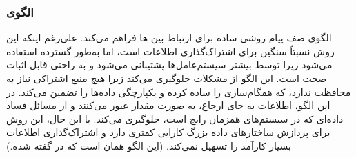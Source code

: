 \subsubsection{الگوی }
\label{archConMessageQueSec}
\begin{RTL}
الگوی صف پیام روشی ساده برای ارتباط بین  ها فراهم می‌کند.
علی‌رغم اینکه این روش نسبتاً سنگین برای اشتراک‌گذاری اطلاعات است، اما به‌طور گسترده
استفاده می‌شود زیرا توسط بیشتر سیستم‌عامل‌ها پشتیبانی می‌شود و به راحتی
قابل اثبات صحت است. این الگو از مشکلات 
جلوگیری می‌کند زیرا هیچ منبع اشتراکی نیاز به محافظت ندارد، که همگام‌سازی را ساده کرده
و یکپارچگی داده‌ها را تضمین می‌کند. در این الگو، اطلاعات به جای ارجاع،
به صورت مقدار عبور می‌کنند و از مسائل فساد داده‌ای
که در سیستم‌های همزمان رایج است، جلوگیری می‌کند. با این حال،
این روش برای پردازش ساختارهای داده بزرگ کارایی کمتری دارد
و اشتراک‌گذاری اطلاعات بسیار کارآمد را تسهیل نمی‌کند.
(این الگو همان  است که در
\cite{ref1} گفته شده.)
\end{RTL}